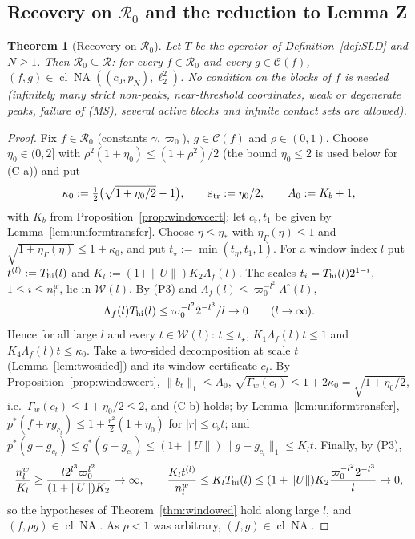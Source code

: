 \documentclass[10pt]{amsart}
\newtheorem{theorem}{Theorem}[section]
\theoremstyle{definition}
\theoremstyle{remark}
\newcommand{\NA}{\operatorname{NA}}
\newcommand{\Cset}{\mathcal C}
\newcommand{\cl}{\operatorname{cl}}
\newcommand{\Rec}{\mathcal R}
\begin{document}
\subsection{Recovery on $\mathcal R_0$ and the reduction to Lemma Z}

\begin{theorem}[Recovery on $\mathcal R_0$]\label{thm:R0}
Let $T$ be the operator of Definition~\ref{def:SLD} and $N\ge1$.  Then
$\mathcal R_0\subseteq\Rec$: for every $f\in\mathcal R_0$ and every
$g\in\Cset(f)$, $(f,g)\in\cl\NA((c_0,p_N),\ell_2^2)$.  No condition on the
blocks of $f$ is needed \textup{(}infinitely many strict non-peaks,
near-threshold coordinates, weak or degenerate peaks, failure of
\textup{(MS)}, several active blocks and infinite contact sets are
allowed\textup{)}.
\end{theorem}

\begin{proof}
Fix $f\in\mathcal R_0$ (constants $\gamma,\varpi_0$), $g\in\Cset(f)$ and
$\rho\in(0,1)$.  Choose $\eta_0\in(0,2]$ with $\rho^2(1+\eta_0)\le(1+\rho^2)/2$
\textup{(}the bound $\eta_0\le2$ is used below for \textup{(C-a)}\textup{)} and
put
\[
 \kappa_0:=\tfrac12\big(\sqrt{1+\eta_0/2}-1\big),\qquad
 \varepsilon_{\rm tr}:=\eta_0/2,\qquad A_0:=K_b+1,
\]
with $K_b$ from Proposition~\ref{prop:windowcert}; let $c_{\flat},t_1$ be given by
Lemma~\ref{lem:uniformtransfer}.  Choose $\eta\le\eta_*$ with
$\eta_\Gamma(\eta)\le1$ and $\sqrt{1+\eta_\Gamma(\eta)}\le1+\kappa_0$, and put
$t_\star:=\min(t_\eta,t_1,1)$.  For a window index $l$ put $t^{(l)}:=
T_{\rm hi}(l)$ and $K_l:=(1+\|U\|)K_2\Lambda_f(l)$.  The scales
$t_i=T_{\rm hi}(l)2^{1-i}$, $1\le i\le n^w_l$, lie in $\mathcal W(l)$.  By
(P3) and $\Lambda_f(l)\le\varpi_0^{-l^2}\Lambda^\circ(l)$,
\[
 \Lambda_f(l)T_{\rm hi}(l)\le\varpi_0^{-l^2}2^{-l^3}/l\to0\qquad(l\to\infty).
\]
Hence for all large $l$ and every $t\in\mathcal W(l)$: $t\le t_\star$,
$K_1\Lambda_f(l)t\le1$ and $K_4\Lambda_f(l)t\le\kappa_0$.  Take a two-sided
decomposition at scale $t$ (Lemma~\ref{lem:twosided}) and its window
certificate $c_t$.  By Proposition~\ref{prop:windowcert},
$\|b_t\|_1\le A_0$, $\sqrt{\Gamma_w(c_t)}\le1+2\kappa_0=\sqrt{1+\eta_0/2}$,
i.e.\ $\Gamma_w(c_t)\le1+\eta_0/2\le2$, and (C-b) holds; by
Lemma~\ref{lem:uniformtransfer}, $p^*(f+rg_{c_t})\le1+\frac{r^2}2(1+\eta_0)$
for $|r|\le c_{\flat}t$; and $p^*(g-g_{c_t})\le q^*(g-g_{c_t})\le(1+\|U\|)
\|g-g_{c_t}\|_1\le K_lt$.  Finally, by (P3),
\[
 \frac{n^w_l}{K_l}\ge\frac{l2^{l^3}\varpi_0^{l^2}}{(1+\|U\|)K_2}\to\infty,
 \qquad\frac{K_lt^{(l)}}{n^w_l}\le K_lT_{\rm hi}(l)\le(1+\|U\|)K_2
 \frac{\varpi_0^{-l^2}2^{-l^3}}l\to0,
\]
so the hypotheses of Theorem~\ref{thm:windowed} hold along large $l$, and
$(f,\rho g)\in\cl\NA$.  As $\rho<1$ was arbitrary, $(f,g)\in\cl\NA$.
\end{proof}
\end{document}
